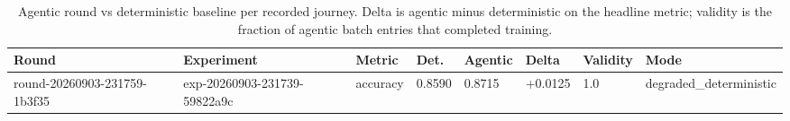 \begin{table}[H]
\centering\small
\caption{Agentic round vs deterministic baseline per recorded journey. Delta is agentic minus deterministic on the headline metric; validity is the fraction of agentic batch entries that completed training.}
\label{tab:agentic-comparison}
\begin{tabular}{llllllll}
\toprule
Round & Experiment & Metric & Det. & Agentic & Delta & Validity & Mode \\
\midrule
round-20260903-231759-1b3f35 & exp-20260903-231739-59822a9c & accuracy & 0.8590 & 0.8715 & +0.0125 & 1.0 & degraded\_deterministic \\
\bottomrule
\end{tabular}
\end{table}
